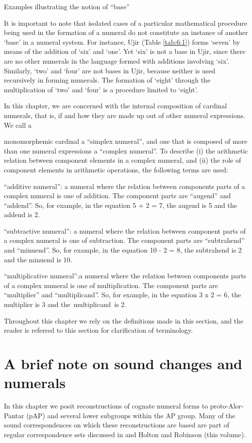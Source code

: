 \documentclass[output=paper]{LSP/langsci}
\begin{document}
\begin{table}
\caption{Examples illustrating the notion of ``base''}
\label{tab:6:1} 
\end{table}

It is important to note that isolated cases of a particular mathematical procedure being used in the formation of a numeral do not constitute an instance of another `base' in a numeral system. For instance, Ujir (Table \ref{tab:6:1}) forms `seven' by means of the addition of `six' and `one'. Yet `six' is not a base in Ujir, since there are no other numerals in the language formed with additions involving `six'. Similarly, `two' and `four' are not bases in Ujir, because neither is used recursively in forming numerals. The formation of `eight' through the multiplication of `two' and `four' is a procedure limited to `eight'.

In this chapter, we are concerned with the internal composition of cardinal numerals, that is, if and how they are made up out of other numeral expressions. We call a 

monomorphemic cardinal a ``simplex numeral'', and one that is composed of more than one numeral expressions a ``complex numeral''. To describe (i) the arithmetic relation between component elements in a complex numeral, and (ii) the role of component elements in arithmetic operations, the following terms are used:

``additive numeral'': a numeral where the relation between components parts of a complex numeral is one of addition. The component parts are ``augend'' and ``addend''.  So, for example, in the equation 5 + 2 = 7, the augend is 5 and the addend is 2.

``subtractive numeral'': a numeral where the relation between component parts of a complex numeral is one of subtraction. The component parts are ``subtrahend'' and ``minuend''. So, for example, in the equation 10 - 2 = 8, the subtrahend is 2 and the minuend is 10.

``multiplicative numeral'':a numeral where the relation between components parts of a complex numeral is one of multiplication. The component parts are ``multiplier'' and ``multiplicand''.  So, for example, in the equation 3 x 2 = 6, the multiplier is 3 and the~multiplicand~is 2. 

Throughout this chapter we rely on the definitions made in this section, and the reader is referred to this section for clarification of terminology.

\section{A brief note on sound changes and numerals}\label{sec:6:3}
In this chapter we posit reconstructions of cognate numeral forms to proto-Alor-Pantar (pAP) and several lower subgroups within the AP group. Many of the sound correspondences on which these reconstructions are based are part of regular correspondence sets discussed in \citet{HoltonEtAl2012} and Holton and Robinson (this volume). 
\end{document}
